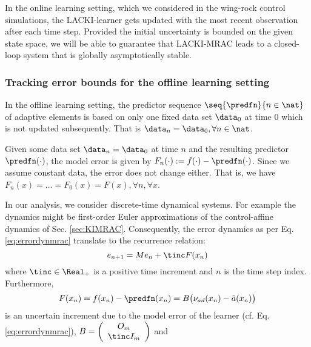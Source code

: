 In the online learning setting, which we considered in the wing-rock control simulations, the LACKI-learner gets updated with the most recent observation after each time step. Provided the initial uncertainty is bounded on the given state space, we will be able to guarantee that LACKI-MRAC leads to a closed-loop system that is globally asymptotically stable. 

\subsubsection{Tracking error bounds for the offline learning setting} 
In the offline learning setting, the predictor sequence $\seq{\predfn}{n \in \nat}$ of adaptive elements is based on only one fixed data set $\data_0$ at time $0$ which is not updated subsequently.
That is $\data_n = \data_0, \forall n \in \nat$.

Given some data set $\data_n =\data_0$ at time $n$ and the resulting predictor $\predfn(\cdot)$, the model error is given by $F_n(\cdot) := f(\cdot) - \predfn(\cdot)$. Since we assume constant data, the error does not change either. That is, we have $F_n(x) = \ldots = F_0(x) = F(x), \forall n,\forall x$.
 
In our analysis, we consider discrete-time dynamical systems. For example the dynamics might be first-order Euler approximations of the control-affine dynamics of Sec. \ref{sec:KIMRAC}.
Consequently, the error dynamics as per Eq. \ref{eq:errordynmrac} translate to the recurrence relation:
\begin{equation}\label{eq:errordynmrac_nIMRACdiscrete}
	e_{n+1}  = M e_n + \tinc F(x_n)
\end{equation}
where $\tinc \in \Real_+$ is a positive time increment and  $n$ is the time step index. Furthermore,
%
\begin{equation}
	F(x_n) = f(x_n) - \predfn(x_n) = B \bigl(\nu_{ad}(x_n) -  \tilde a(x_n)\bigr) 
\end{equation}
is an uncertain increment due to the model error of the learner (cf. Eq. \ref{eq:errordynmrac}), 						$B = \left(\begin{array}[h]{c}
				O_m \\ \tinc I_m
						\end{array}\right)$ and 

